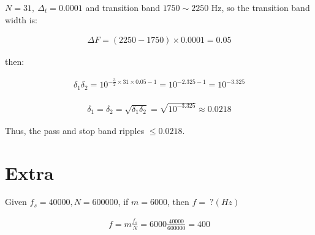 \documentclass{article}
\begin{document}
$N = 31, \ \Delta_t = 0.0001$ and transition band $1750 \sim 2250 \text{ Hz}$,
so the transition band width is:

\begin{align*}
    \Delta F = (2250 - 1750) \times 0.0001 = 0.05
\end{align*}

then:

\begin{align*}
    \delta_1 \delta_2 = 10^{-\frac{3}{2} \times 31 \times 0.05 - 1} = 10^{-2.325 - 1} = 10^{-3.325}
\end{align*}

\begin{align*}
    \delta_1 = \delta_2 = \sqrt{\delta_1 \delta_2} = \sqrt{10^{-3.325}} \approx 0.0218
\end{align*}

Thus, the pass and stop band ripples $\le 0.0218$.

\section*{Extra}

Given $f_s = 40000, N = 600000$, if $m = 6000$, then $f = \ ? (Hz)$

\begin{align*}
    f = m \frac{f_s}{N} = 6000 \frac{40000}{600000} = 400
\end{align*}
\end{document}
